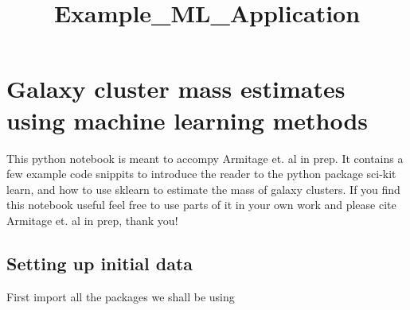 \documentclass[11pt]{article}
\title{Example\_ML\_Application}
\begin{document}
    
    
    \maketitle
    
    

    
    \section{Galaxy cluster mass estimates using machine learning
methods}\label{galaxy-cluster-mass-estimates-using-machine-learning-methods}

    This python notebook is meant to accompy Armitage et. al in prep. It
contains a few example code snippits to introduce the reader to the
python package sci-kit learn, and how to use sklearn to estimate the
mass of galaxy clusters. If you find this notebook useful feel free to
use parts of it in your own work and please cite Armitage et. al in
prep, thank you!

    \subsection{Setting up initial data}\label{setting-up-initial-data}

    First import all the packages we shall be using
\end{document}
